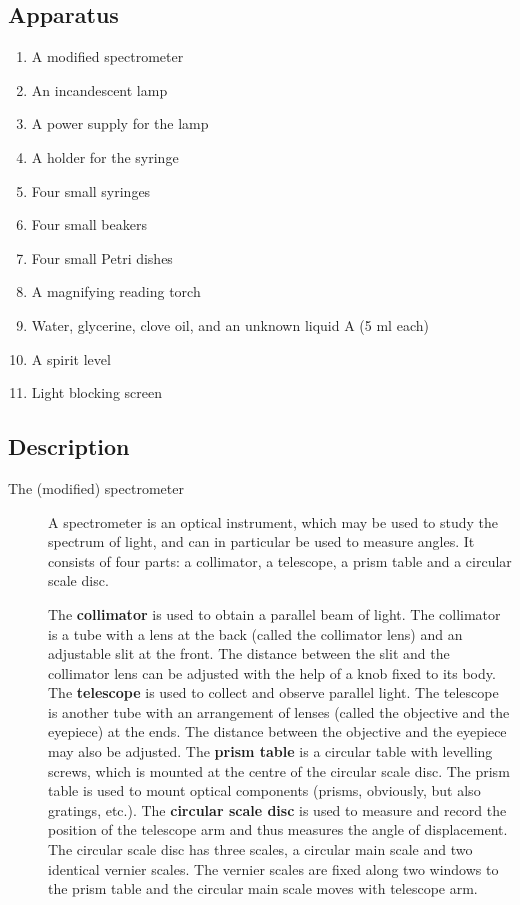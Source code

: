\begin{refsection}
\subsection*{Apparatus}

\begin{enumerate}
\item A modified spectrometer 
\item An incandescent lamp
\item A power supply for the lamp
\item A holder for the syringe 
\item Four small syringes 
\item Four small beakers 
\item Four small Petri dishes 
\item A magnifying reading torch 
\item Water, glycerine, clove oil, and an unknown liquid A (5 ml each)
\item A spirit level 
\item Light blocking screen
\end{enumerate}


\subsection*{Description}

\begin{description}
    \item[The (modified) spectrometer]

    A spectrometer is an optical instrument, which may be used to study the spectrum of light, and can in particular be used to measure angles. It consists of four parts: a collimator, a telescope, a prism table and a circular scale disc.

    The \textbf{collimator} is used to obtain a parallel beam of light. The collimator is a tube with a lens at the back (called the collimator lens) and an adjustable slit at the front. The distance between the slit and the collimator lens can be adjusted with the help of a knob fixed to its body. The \textbf{telescope} is used to collect and observe parallel light. The telescope is another tube with an arrangement of lenses (called the objective and the eyepiece) at the ends. The distance between the objective and the eyepiece may also be adjusted. The \textbf{prism table} is a circular table with levelling screws, which is mounted at the centre of the circular scale disc. The prism table is used to mount optical components (prisms, obviously, but also gratings, etc.).  The \textbf{circular scale disc} is used to measure and record the position of the telescope arm and thus measures the angle of displacement. The circular scale disc has three scales, a circular main scale and two identical vernier scales. The vernier scales are fixed along two windows to the prism table and the circular main scale moves with telescope arm.  


\end{description}
\end{refsection}
